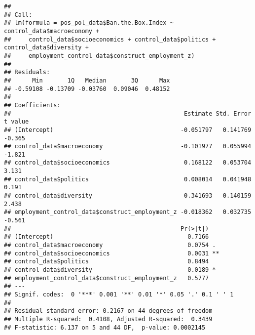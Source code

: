 \documentclass[
]{article}
\newenvironment{Shaded}{\begin{snugshade}}{\end{snugshade}}
\newcommand{\CommentTok}[1]{\textcolor[rgb]{0.56,0.35,0.01}{\textit{#1}}}
\newcommand{\FunctionTok}[1]{\textcolor[rgb]{0.13,0.29,0.53}{\textbf{#1}}}
\newcommand{\NormalTok}[1]{#1}
\newcommand{\OtherTok}[1]{\textcolor[rgb]{0.56,0.35,0.01}{#1}}
\newcommand{\SpecialCharTok}[1]{\textcolor[rgb]{0.81,0.36,0.00}{\textbf{#1}}}
\begin{document}
\begin{Shaded}
\end{Shaded}

\begin{verbatim}
## 
## Call:
## lm(formula = pos_pol_data$Ban.the.Box.Index ~ control_data$macroeconomy + 
##     control_data$socioeconomics + control_data$politics + control_data$diversity + 
##     employment_control_data$construct_employment_z)
## 
## Residuals:
##      Min       1Q   Median       3Q      Max 
## -0.59108 -0.13709 -0.03760  0.09046  0.48152 
## 
## Coefficients:
##                                                 Estimate Std. Error t value
## (Intercept)                                    -0.051797   0.141769  -0.365
## control_data$macroeconomy                      -0.101977   0.055994  -1.821
## control_data$socioeconomics                     0.168122   0.053704   3.131
## control_data$politics                           0.008014   0.041948   0.191
## control_data$diversity                          0.341693   0.140159   2.438
## employment_control_data$construct_employment_z -0.018362   0.032735  -0.561
##                                                Pr(>|t|)   
## (Intercept)                                      0.7166   
## control_data$macroeconomy                        0.0754 . 
## control_data$socioeconomics                      0.0031 **
## control_data$politics                            0.8494   
## control_data$diversity                           0.0189 * 
## employment_control_data$construct_employment_z   0.5777   
## ---
## Signif. codes:  0 '***' 0.001 '**' 0.01 '*' 0.05 '.' 0.1 ' ' 1
## 
## Residual standard error: 0.2167 on 44 degrees of freedom
## Multiple R-squared:  0.4108, Adjusted R-squared:  0.3439 
## F-statistic: 6.137 on 5 and 44 DF,  p-value: 0.0002145
\end{verbatim}
\end{document}
